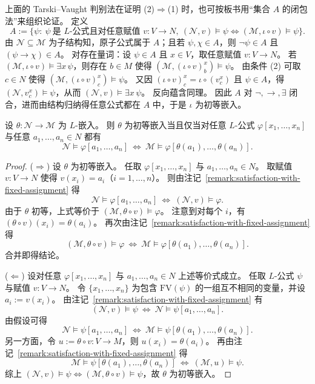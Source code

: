 \documentclass[lang=cn,a4paper,newtx,section]{elegantbook}
\begin{document}
 
\begin{remark}
上面的 Tarski--Vaught 判别法在证明 (2)$\Rightarrow$(1) 时，也可按板书用“集合 $A$ 的闭包法”来组织论证。
定义
\[
  A:=\{\psi:\ \psi\ \text{是 $L$-公式且对任意赋值 }v:V\to N,\ (\mathcal N,v)\models\psi\Longleftrightarrow(\mathcal M,\iota\circ v)\models\psi\}.
\]
由 $\mathcal N\subseteq\mathcal M$ 为子结构知，原子公式属于 $A$；且若 $\psi,\chi\in A$，则 $\neg\psi\in A$ 且 $(\psi\to\chi)\in A$。
对存在量词：设 $\psi\in A$ 且 $x\in V$，取任意赋值 $v:V\to N$。
若 $(\mathcal M,\iota\circ v)\models\exists x\,\psi$，则存在 $b\in M$ 使得 $(\mathcal M,(\iota\circ v)^{x}_{b})\models\psi$。
由条件 (2) 可取 $c\in N$ 使得 $(\mathcal M,(\iota\circ v)^{x}_{c})\models\psi$。
又因 $(\iota\circ v)^{x}_{c}=\iota\circ(v^{x}_{c})$ 且 $\psi\in A$，得 $(\mathcal N,v^{x}_{c})\models\psi$，从而 $(\mathcal N,v)\models\exists x\,\psi$。
反向蕴含同理。
因此 $A$ 对 $\neg,\to,\exists$ 闭合，进而由结构归纳得任意公式都在 $A$ 中，于是 $\iota$ 为初等嵌入。
\end{remark}

\begin{proposition}[初等嵌入的参数刻画]
 \label{elementary-embedding-parameter-characterization}
 设 $\theta:\mathcal N\to\mathcal M$ 为 $L$-嵌入。
 则 $\theta$ 为初等嵌入当且仅当对任意 $L$-公式 $\varphi[x_1,\dots,x_n]$ 与任意 $a_1,\dots,a_n\in N$ 都有
 \[
   \mathcal N\models\varphi[a_1,\dots,a_n]\ \Longleftrightarrow\ \mathcal M\models\varphi[\theta(a_1),\dots,\theta(a_n)].
 \]
 \end{proposition}

 \begin{proof}
 ($\Rightarrow$) 设 $\theta$ 为初等嵌入。
 任取 $\varphi[x_1,\dots,x_n]$ 与 $a_1,\dots,a_n\in N$。
 取赋值 $v:V\to N$ 使得 $v(x_i)=a_i$（$i=1,\dots,n$）。
 则由注记~\ref{remark:satisfaction-with-fixed-assignment} 得
 \[
   \mathcal N\models\varphi[a_1,\dots,a_n]\ \Longleftrightarrow\ (\mathcal N,v)\models\varphi.
 \]
 由于 $\theta$ 初等，上式等价于 $(\mathcal M,\theta\circ v)\models\varphi$。
 注意到对每个 $i$，有 $(\theta\circ v)(x_i)=\theta(a_i)$。
 再次由注记~\ref{remark:satisfaction-with-fixed-assignment} 得
 \[
   (\mathcal M,\theta\circ v)\models\varphi\ \Longleftrightarrow\ \mathcal M\models\varphi[\theta(a_1),\dots,\theta(a_n)].
 \]
 合并即得结论。

 ($\Leftarrow$) 设对任意 $\varphi[x_1,\dots,x_n]$ 与 $a_1,\dots,a_n\in N$ 上述等价式成立。
 任取 $L$-公式 $\psi$ 与赋值 $v:V\to N$。
 令 $\{x_1,\dots,x_n\}$ 为包含 $\mathrm{FV}(\psi)$ 的一组互不相同的变量，并设 $a_i:=v(x_i)$。
 由注记~\ref{remark:satisfaction-with-fixed-assignment} 有
 \[
   (\mathcal N,v)\models\psi\ \Longleftrightarrow\ \mathcal N\models\psi[a_1,\dots,a_n].
 \]
 由假设可得
 \[
   \mathcal N\models\psi[a_1,\dots,a_n]\ \Longleftrightarrow\ \mathcal M\models\psi[\theta(a_1),\dots,\theta(a_n)].
 \]
 另一方面，令 $u:=\theta\circ v:V\to M$，则 $u(x_i)=\theta(a_i)$。
 再由注记~\ref{remark:satisfaction-with-fixed-assignment} 得
 \[
   \mathcal M\models\psi[\theta(a_1),\dots,\theta(a_n)]\ \Longleftrightarrow\ (\mathcal M,u)\models\psi.
 \]
 综上 $(\mathcal N,v)\models\psi\Longleftrightarrow(\mathcal M,\theta\circ v)\models\psi$，故 $\theta$ 为初等嵌入。
 \end{proof}
\end{document}

